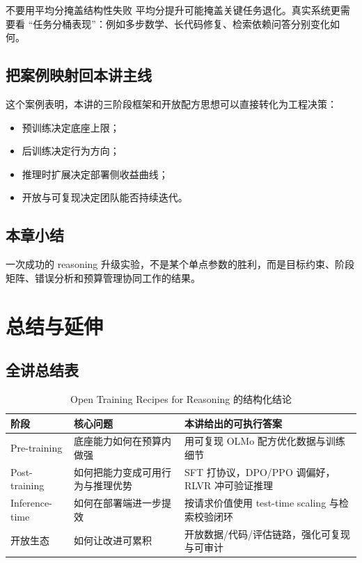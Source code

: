 \documentclass[a4paper]{article}
\begin{document}
\begin{warningbox}{不要用平均分掩盖结构性失败}
平均分提升可能掩盖关键任务退化。真实系统更需要看 ``任务分桶表现''：例如多步数学、长代码修复、检索依赖问答分别变化如何。
\end{warningbox}

\subsection{把案例映射回本讲主线}
这个案例表明，本讲的三阶段框架和开放配方思想可以直接转化为工程决策：
\begin{itemize}
    \item 预训练决定底座上限；
    \item 后训练决定行为方向；
    \item 推理时扩展决定部署侧收益曲线；
    \item 开放与可复现决定团队能否持续迭代。
\end{itemize}

\subsection{本章小结}
一次成功的 reasoning 升级实验，不是某个单点参数的胜利，而是目标约束、阶段矩阵、错误分析和预算管理协同工作的结果。


\section{总结与延伸}

\subsection{全讲总结表}
\begin{table}[H]
\centering
\renewcommand{\arraystretch}{1.2}
\begin{tabular}{p{2.7cm}p{3.9cm}p{4.2cm}}
\toprule
\textbf{阶段} & \textbf{核心问题} & \textbf{本讲给出的可执行答案} \\
\midrule
Pre-training & 底座能力如何在预算内做强 & 用可复现 OLMo 配方优化数据与训练细节 \\
Post-training & 如何把能力变成可用行为与推理优势 & SFT 打协议，DPO/PPO 调偏好，RLVR 冲可验证推理 \\
Inference-time & 如何在部署端进一步提效 & 按请求价值使用 test-time scaling 与检索校验闭环 \\
开放生态 & 如何让改进可累积 & 开放数据/代码/评估链路，强化可复现与可审计 \\
\bottomrule
\end{tabular}
\caption{Open Training Recipes for Reasoning 的结构化结论}
\end{table}
\end{document}
